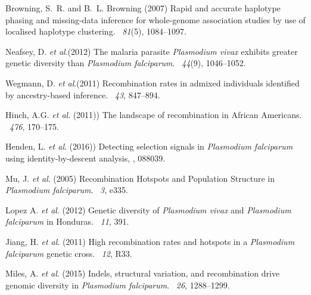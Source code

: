 \documentclass{article}
\begin{document}
\begin{thebibliography}{}

Browning, S.~R. and B.~L. Browning (2007)
\newblock Rapid and accurate haplotype phasing and missing-data inference for
  whole-genome association studies by use of localised haplotype clustering.
~{\em 81\/}(5), 1084--1097.

Neafsey, D. {\em et al}.(2012)
\newblock The malaria parasite {\it Plasmodium vivax} exhibits greater genetic diversity than {\it Plasmodium falciparum}.
~{\em 44\/}(9), 1046--1052.

Wegmann, D. {\em et al}.(2011)
\newblock Recombination rates in admixed individuals identified by ancestry-based inference.
~{\em 43\/}, 847--894.

Hinch, A.G. {\em et al}. (2011))
\newblock The landscape of recombination in African Americans.
~{\em 476}, 170--175.

Henden, L. {\em et al}. (2016))
\newblock Detecting selection signals in {\it Plasmodium falciparum} using identity-by-descent analysis,
, 088039.


Mu, J. {\em et al}. (2005)
\newblock Recombination Hotspots and Population Structure in {\it Plasmodium falciparum}.
~{\em 3}, e335.


Lopez A. {\em et al}. (2012)
\newblock Genetic diversity of {\it Plasmodium vivax} and {\it Plasmodium falciparum} in Honduras.
~{\em 11}, 391.

Jiang, H. {\em et al}. (2011)
\newblock High recombination rates and hotspots in a {\it Plasmodium falciparum} genetic cross.
~{\em 12}, R33.


Miles, A. {\em et al}. (2015)
\newblock Indels, structural variation, and recombination drive genomic diversity in {\it Plasmodium falciparum}.
~{\em26\/}, 1288--1299.


\end{thebibliography}
\end{document}
